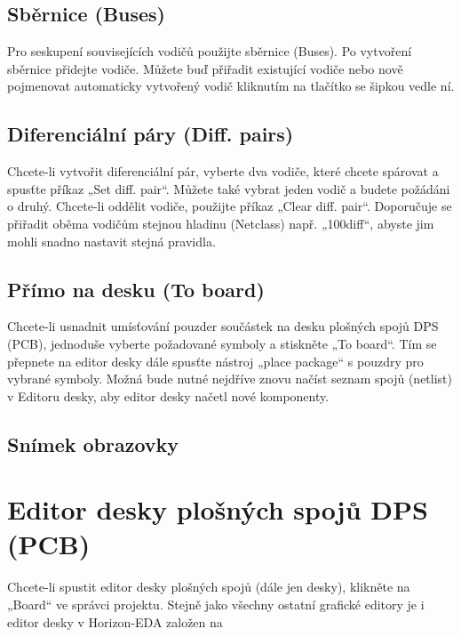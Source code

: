 \documentclass[letterpaper,10pt,czech]{sphinxmanual}
\begin{document}
\section{Sběrnice (Buses)}
\label{\detokenize{imp-sch:sbernice-buses}}
Pro seskupení souvisejících vodičů použijte sběrnice (Buses). Po vytvoření sběrnice přidejte vodiče. Můžete buď přiřadit existující vodiče nebo nově pojmenovat automaticky vytvořený vodič kliknutím na tlačítko se šipkou vedle ní.


\section{Diferenciální páry (Diff. pairs)}
\label{\detokenize{imp-sch:diferencialni-pary-diff-pairs}}\label{\detokenize{imp-sch:diferencialni-pary}}
Chcete-li vytvořit diferenciální pár, vyberte dva vodiče, které chcete spárovat a spusťte příkaz „Set diff. pair“. Můžete také vybrat jeden vodič a budete požádáni o druhý. Chcete-li oddělit vodiče, použijte příkaz „Clear diff. pair“. Doporučuje se přiřadit oběma vodičům stejnou hladinu (Netclass) např. „100diff“, abyste jim mohli snadno nastavit stejná pravidla.


\section{Přímo na desku (To board)}
\label{\detokenize{imp-sch:primo-na-desku-to-board}}
Chcete-li usnadnit umísťování pouzder součástek na desku plošných spojů DPS (PCB), jednoduše vyberte
požadované symboly a stiskněte „To board“. Tím se přepnete na editor desky dále spusťte nástroj „place package“ s pouzdry pro vybrané symboly. Možná bude nutné nejdříve znovu načíst seznam spojů (netlist) v Editoru desky, aby editor desky načetl nové komponenty.


\section{Snímek obrazovky}
\label{\detokenize{imp-sch:snimek-obrazovky}}
\begin{figure}[htbp]
\centering

\noindent{}
\end{figure}


\chapter{Editor desky plošných spojů DPS (PCB)}
\label{\detokenize{imp-board:editor-desky-plosnych-spoju-dps-pcb}}\label{\detokenize{imp-board::doc}}
Chcete-li spustit editor desky plošných spojů (dále jen desky), klikněte na „Board“ ve správci projektu. Stejně jako všechny ostatní grafické editory je i editor desky v Horizon-EDA založen na 
\end{document}
